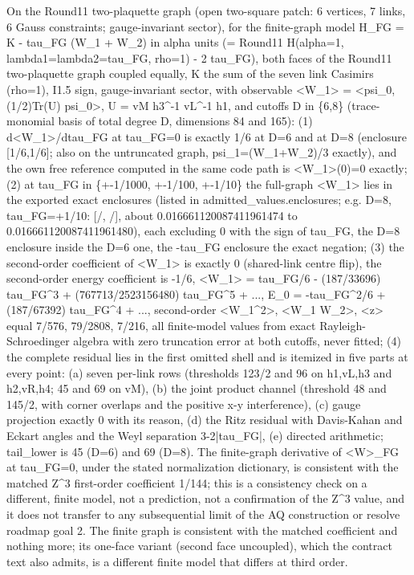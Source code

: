 \begin{gatequote}
On the Round11 two-plaquette graph (open two-square patch: 6 vertices, 7
links, 6 Gauss constraints; gauge-invariant sector), for the finite-graph
model H\_FG = K - tau\_FG (W\_1 + W\_2) in alpha units (= Round11 H(alpha=1,
lambda1=lambda2=tau\_FG, rho=1) - 2 tau\_FG), both faces of the Round11
two-plaquette graph coupled equally, K the sum of the seven link Casimirs
(rho=1), I1.5 sign, gauge-invariant sector, with observable <W\_1> =
<psi\_0,(1/2)Tr(U) psi\_0>, U = vM h3\textasciicircum{}-1
vL\textasciicircum{}-1 h1, and cutoffs D in \{6,8\} (trace-monomial basis of
total degree D, dimensions 84 and 165): (1) d<W\_1>/dtau\_FG at tau\_FG=0 is
exactly 1/6 at D=6 and at D=8 (enclosure [1/6,1/6]; also on the untruncated
graph, psi\_1=(W\_1+W\_2)/3 exactly), and the own free reference computed in
the same code path is <W\_1>(0)=0 exactly; (2) at tau\_FG in \{+-1/1000,
+-1/100, +-1/10\} the full-graph <W\_1> lies in the exported exact enclosures
(listed in admitted\_values.enclosures; e.g. D=8, tau\_FG=+1/10: [/, /], about 0.016661120087411961474
to 0.016661120087411961480), each excluding 0 with the sign of tau\_FG, the
D=8 enclosure inside the D=6 one, the -tau\_FG enclosure the exact negation;
(3) the second-order coefficient of <W\_1> is exactly 0 (shared-link centre
flip), the second-order energy coefficient is -1/6, <W\_1> = tau\_FG/6 -
(187/33696) tau\_FG\textasciicircum{}3 + (767713/2523156480)
tau\_FG\textasciicircum{}5 + ..., E\_0 = -tau\_FG\textasciicircum{}2/6 +
(187/67392) tau\_FG\textasciicircum{}4 + ..., second-order
<W\_1\textasciicircum{}2>, <W\_1 W\_2>, <z> equal 7/576, 79/2808, 7/216, all
finite-model values from exact Rayleigh-Schroedinger algebra with zero
truncation error at both cutoffs, never fitted; (4) the complete residual lies
in the first omitted shell and is itemized in five parts at every point: (a)
seven per-link rows (thresholds 123/2 and 96 on h1,vL,h3 and h2,vR,h4; 45 and
69 on vM), (b) the joint product channel (threshold 48 and 145/2, with corner
overlaps and the positive x-y interference), (c) gauge projection exactly 0
with its reason, (d) the Ritz residual with Davis-Kahan and Eckart angles and
the Weyl separation 3-2|tau\_FG|, (e) directed arithmetic; tail\_lower is 45
(D=6) and 69 (D=8). The finite-graph derivative of <W>\_FG at tau\_FG=0, under
the stated normalization dictionary, is consistent with the matched
Z\textasciicircum{}3 first-order coefficient 1/144; this is a consistency
check on a different, finite model, not a prediction, not a confirmation of
the Z\textasciicircum{}3 value, and it does not transfer to any subsequential
limit of the AQ construction or resolve roadmap goal 2. The finite graph is
consistent with the matched coefficient and nothing more; its one-face variant
(second face uncoupled), which the contract text also admits, is a different
finite model that differs at third order.
\end{gatequote}
